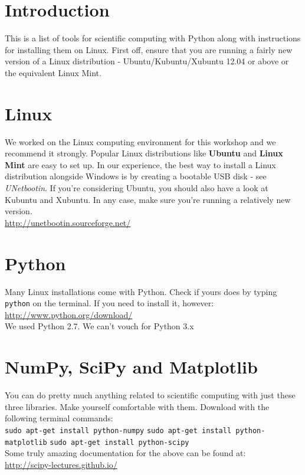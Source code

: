 \documentclass{article}
\begin{document}
\maketitle
\tableofcontents
\section{Introduction}
This is a list of tools for scientific computing with Python along with instructions
for installing them on Linux. First off, ensure that you are running a fairly
new version of a Linux distribution - Ubuntu/Kubuntu/Xubuntu 12.04 or above or
the equivalent Linux Mint.

\section{Linux}
We worked on the Linux computing environment for this workshop and we recommend
it strongly. Popular Linux distributions like \textbf{Ubuntu} and \textbf{Linux Mint}
are easy to set up. In our experience, the best way to install a Linux distribution
alongside Windows is by creating a bootable USB disk - see \emph{UNetbootin}. 
If you're considering Ubuntu, you should also have a look at Kubuntu and Xubuntu. 
In any case, make sure you're running a relatively new version.
\newline \\
\url{http://unetbootin.sourceforge.net/}

\section{Python}
Many Linux installations come with Python. Check if yours does by typing \texttt{python}
on the terminal. If you need to install it, however: \newline \\
\url{http://www.python.org/download/}
\newline \\ We used Python 2.7. We can't vouch for Python 3.x

\section{NumPy, SciPy and Matplotlib}
You can do pretty much anything related to scientific computing with just these
three libraries. Make yourself comfortable with them. Download with the following 
terminal commands: \newline \\
\texttt{sudo apt-get install python-numpy}
\texttt{sudo apt-get install python-matplotlib}
\texttt{sudo apt-get install python-scipy}
\newline \\ Some truly amazing documentation for the above can be found at:
\newline \\ \url{http://scipy-lectures.github.io/}
\end{document}
